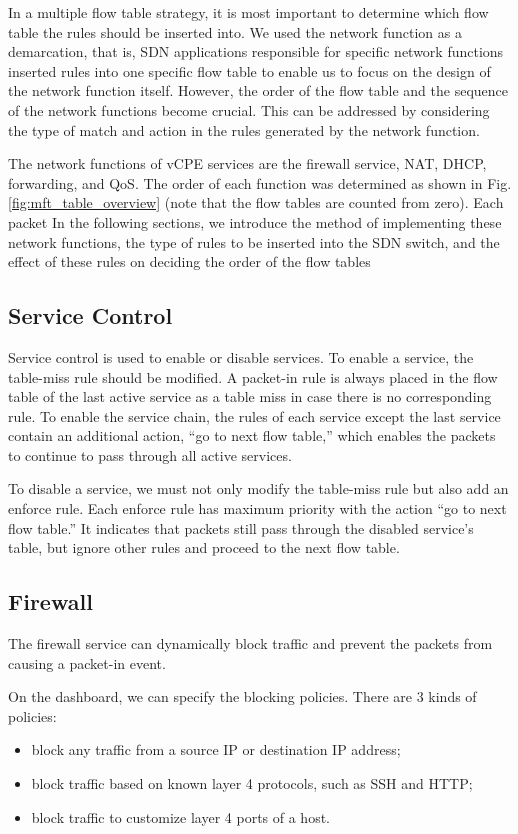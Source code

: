 \documentclass[journal]{IEEEtran}
\begin{document}
In a multiple flow table strategy, it is most important to determine which flow table the rules should be inserted into. We used the network function as a demarcation, that is, SDN applications responsible for specific network functions inserted rules into one specific flow table to enable us to focus on the design of the network function itself. However, the order of the flow table and the sequence of the network functions become crucial. This can be addressed by considering the type of match and action in the rules generated by the network function.

The network functions of vCPE services are the firewall service, NAT, DHCP, forwarding, and QoS. The order of each function was determined as shown in Fig. \ref{fig:mft_table_overview} (note that the flow tables are counted from zero). Each packet In the following sections, we introduce the method of implementing these network functions, the type of rules to be inserted into the SDN switch, and the effect of these rules on deciding the order of the flow tables



\subsection{Service Control}
Service control is used to enable or disable services. To enable a service, the table-miss rule should be modified. A packet-in rule is always placed in the flow table of the last active service as a table miss in case there is no corresponding rule. To enable the service chain, the rules of each service except the last service contain an additional action, “go to next flow table,” which enables the packets to continue to pass through all active services.

To disable a service, we must not only modify the table-miss rule but also add an enforce rule. Each enforce rule has maximum priority with the action “go to next flow table.” It indicates that packets still pass through the disabled service’s table, but ignore other rules and proceed to the next flow table.



\subsection{Firewall}
The firewall service can dynamically block traffic and prevent the packets from causing a packet-in event.

On the dashboard, we can specify the blocking policies. There are 3 kinds of policies:
\begin{itemize}[]
\item block any traffic from a source IP or destination IP address;
\item block traffic based on known layer 4 protocols, such as SSH and HTTP;
\item block traffic to customize layer 4 ports of a host.
\end{itemize}
\end{document}
